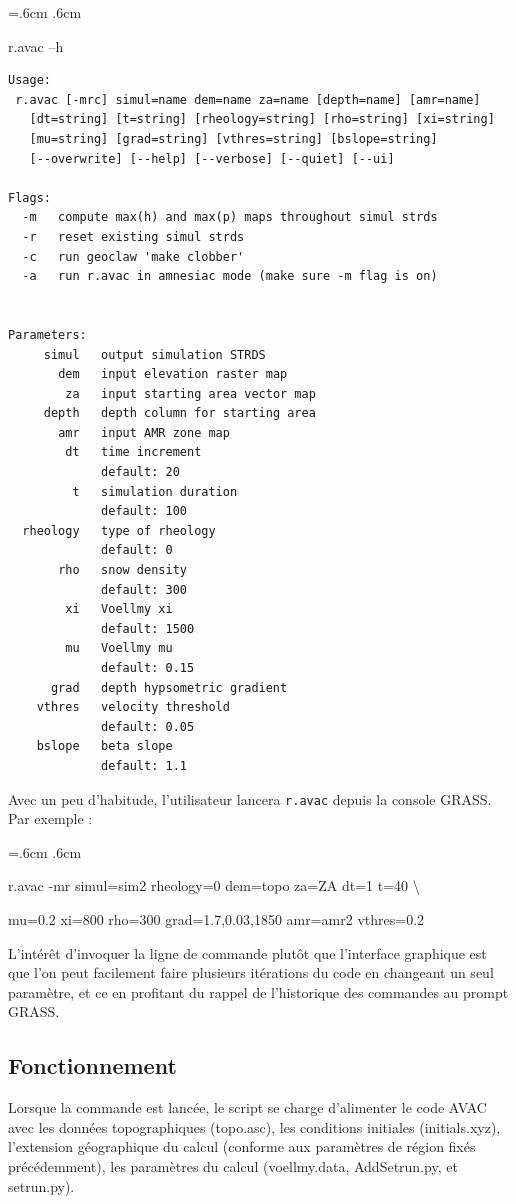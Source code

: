 \documentclass[12pt,oneside]{paper}
\newenvironment{code}{%
\vspace{2mm}%
\hangindent=.6cm%
\parindent.6cm%
\ttfamily%
\color{gris.3}%
}{
\vspace{2mm}%
}
\begin{document}
\begin{code}
r.avac --h
\begin{Verbatim}
Usage:
 r.avac [-mrc] simul=name dem=name za=name [depth=name] [amr=name]
   [dt=string] [t=string] [rheology=string] [rho=string] [xi=string]
   [mu=string] [grad=string] [vthres=string] [bslope=string]
   [--overwrite] [--help] [--verbose] [--quiet] [--ui]

Flags:
  -m   compute max(h) and max(p) maps throughout simul strds
  -r   reset existing simul strds
  -c   run geoclaw 'make clobber'
  -a   run r.avac in amnesiac mode (make sure -m flag is on)


Parameters:
     simul   output simulation STRDS
       dem   input elevation raster map
        za   input starting area vector map
     depth   depth column for starting area
       amr   input AMR zone map
        dt   time increment
             default: 20
         t   simulation duration
             default: 100
  rheology   type of rheology
             default: 0
       rho   snow density
             default: 300
        xi   Voellmy xi
             default: 1500
        mu   Voellmy mu
             default: 0.15
      grad   depth hypsometric gradient
    vthres   velocity threshold
             default: 0.05
    bslope   beta slope
             default: 1.1
\end{Verbatim}
\end{code}

Avec un peu d'habitude, l'utilisateur lancera \verb+r.avac+ depuis la console GRASS. Par exemple :

\begin{code}
r.avac -mr simul=sim2 rheology=0 dem=topo za=ZA dt=1 t=40 \backslash 

mu=0.2 xi=800 rho=300 grad=1.7,0.03,1850 amr=amr2 vthres=0.2
\end{code}

L'intérêt d'invoquer la ligne de commande plutôt que l'interface graphique est que l'on peut facilement faire plusieurs itérations du code en changeant un seul paramètre, et ce en profitant du rappel de l'historique des commandes au prompt GRASS.

\subsection{Fonctionnement}

Lorsque la commande est lancée, le script se charge d'alimenter le code AVAC avec les données topographiques (topo.asc), les conditions initiales (initials.xyz), l'extension géographique du calcul (conforme aux paramètres de région fixés précédemment), les paramètres du calcul (voellmy.data, AddSetrun.py, et setrun.py).
\end{document}
